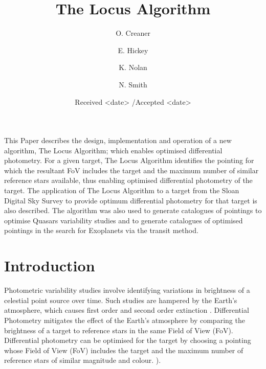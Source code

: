 \documentclass{aa}
\begin{document}

\title{The Locus Algorithm}
\subtitle{}


\author{O. Creaner
\and
E. Hickey
\and
K. Nolan
\and
N. Smith
}


\date{Received <date> /Accepted <date>}
\abstract{}{}{}{}{} 
\abstract 
  {}
  {This Paper describes the design, implementation and operation of a new algorithm,
  The Locus Algorithm; which enables optimised differential photometry.}
   {For a given target, The Locus Algorithm identifies the pointing for
  which the resultant FoV includes the target and the maximum number of
  similar reference stars available, thus enabling optimised differential
  photometry of the target. }
   {The application of The Locus Algorithm to a target from the Sloan Digital Sky Survey to provide
  optimum differential photometry for that target is also described. The algorithm was also
  used to generate catalogues of pointings to optimise Quasars
  variability studies and to generate catalogues of optimised pointings in
  the search for Exoplanets via the transit method.}
   {}  

\maketitle

\section{Introduction}
\label{introduction}

Photometric variability studies involve identifying variations in
brightness of a celestial point source over time. Such studies are
hampered by the Earth's atmosphere, which causes first order and second
order extinction \citep{milone2011high,young1991precise}. Differential
Photometry mitigates the effect of the Earth's atmosphere by comparing
the brightness of a target to reference stars in the same Field of View
(FoV). Differential photometry can be optimised for the target by
choosing a pointing whose Field of View (FoV) includes the target and
the maximum number of reference stars of similar magnitude and colour.
\citep{milone2011high,young1991precise,howell2006handbook,honeycutt1992ccd}).
\end{document}

